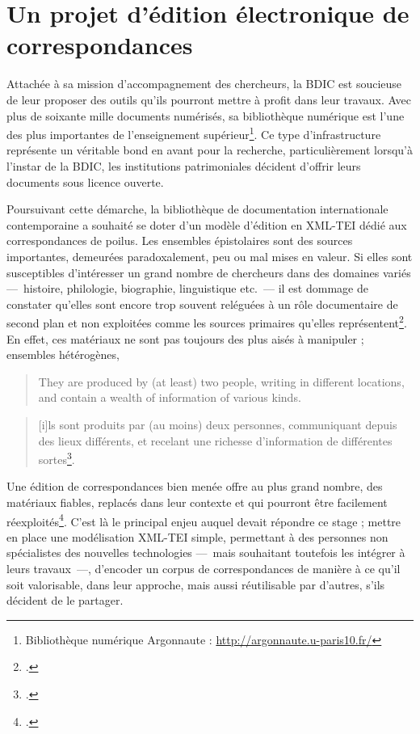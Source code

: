 \documentclass[12pt,a4paper]{book} %
\begin{document}
\section*{Un projet d'édition électronique de correspondances}

Attachée à sa mission d'accompagnement des chercheurs, la BDIC est soucieuse de leur proposer des outils qu'ils pourront mettre à profit dans leur travaux. Avec plus de soixante mille documents numérisés, sa bibliothèque numérique est l'une des plus importantes de l'enseignement supérieur\footnote{Bibliothèque numérique Argonnaute : \url{http://argonnaute.u-paris10.fr/}}. Ce type d'infrastructure représente un véritable bond en avant pour la recherche, particulièrement lorsqu'à l'instar de la BDIC,  les institutions patrimoniales décident d'offrir leurs documents sous licence ouverte.

Poursuivant cette démarche, la bibliothèque de documentation internationale contemporaine a souhaité se doter d'un modèle d'édition en XML-TEI dédié aux correspondances de poilus. Les ensembles épistolaires sont des sources importantes, demeurées paradoxalement, peu ou mal mises en valeur. Si elles sont susceptibles d'intéresser un grand nombre de chercheurs dans des domaines variés ---~histoire, philologie, biographie, linguistique etc.~--- il est dommage de constater qu'elles sont encore trop souvent reléguées à un rôle documentaire de second plan et non exploitées comme les sources primaires qu'elles représentent\footcite{vanhoutte_describing_2009}. En effet, ces matériaux ne sont pas toujours des plus aisés à manipuler ; ensembles hétérogènes, 
\begin{quote}
\begin{otherlanguage}{english}
They are produced by (at least) two people, writing in different locations, and contain a wealth of information of various kinds.
\end{otherlanguage}
\end{quote}
\begin{quote}
[i]ls sont produits par (au moins) deux personnes, communiquant depuis des lieux différents, et recelant une richesse d'information de différentes sortes\footcite{desenclos_early_2015}.
\end{quote}
Une édition de correspondances bien menée offre au plus grand nombre, des matériaux fiables, replacés dans leur contexte et qui pourront être facilement réexploités\footcite{nougaret_ledition_2015}. C'est là le principal enjeu auquel devait répondre ce stage ; mettre en place une modélisation XML-TEI simple, permettant à des personnes non spécialistes des nouvelles technologies ---~mais souhaitant toutefois les intégrer à leurs travaux~---, d'encoder un corpus de correspondances de manière à ce qu'il soit valorisable, dans leur approche, mais aussi réutilisable par d'autres, s'ils décident de le partager.  
\end{document}
